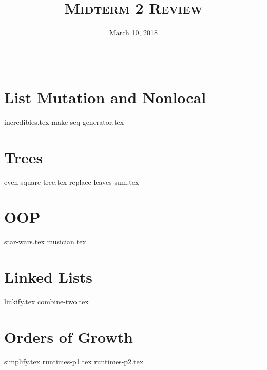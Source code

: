 \documentclass{exam}
\title{\textsc{Midterm 2 Review}}
\date{March 10, 2018}
\begin{document}
\maketitle
\rule{\textwidth}{0.15em}
\fontsize{12}{15}\selectfont




\section{List Mutation and Nonlocal}
\begin{questions}
{incredibles.tex}
\newpage
{make-seq-generator.tex}
\end{questions}

\newpage
\section{Trees}
\begin{questions}
{even-square-tree.tex}
\newpage
{replace-leaves-sum.tex}
\end{questions}

\newpage
\section{OOP}
\begin{questions}
{star-wars.tex}
\newpage
{musician.tex}
\end{questions}

\newpage
\section{Linked Lists}
\begin{questions}
{linkify.tex}
{combine-two.tex}
\end{questions}


\newpage
\section{Orders of Growth}
\begin{questions}
{simplify.tex}
{runtimes-p1.tex}
\newpage
{runtimes-p2.tex}
\end{questions}
\end{document}
